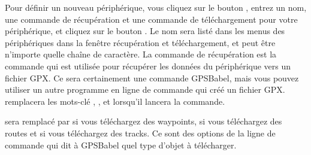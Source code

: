 Pour définir un nouveau périphérique, vous cliquez sur le bouton , entrez un nom, une commande de récupération et
une commande de téléchargement pour votre périphérique, et cliquez sur le bouton .
Le nom sera listé dans les menus des périphériques dans la fenêtre récupération et téléchargement, et peut être n'importe quelle chaîne de caractère.
La commande de récupération est la commande qui est utilisée pour récupérer les données du périphérique vers un fichier GPX.
Ce sera certainement une commande GPSBabel, mais vous pouvez utiliser un autre programme en ligne de commande qui créé un fichier GPX.
\qg remplacera les mots-clé , , et  lorsqu'il lancera la commande.

 sera remplacé par {}\og {}\fg  si vous téléchargez des waypoints, {}\og {}\fg si vous téléchargez des routes et
{}\og {}\fg si vous téléchargez des tracks.
Ce sont des options de la ligne de commande qui dit à GPSBabel quel type d'objet  à télécharger.

